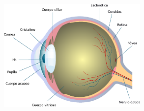 ~\cite{joseramon2005}
\begin{center}
    \includegraphics[width=0.55\textwidth]{Capitulo2/Fig1_2.eps}       
    \label{Fig1_2}
\end{center}

